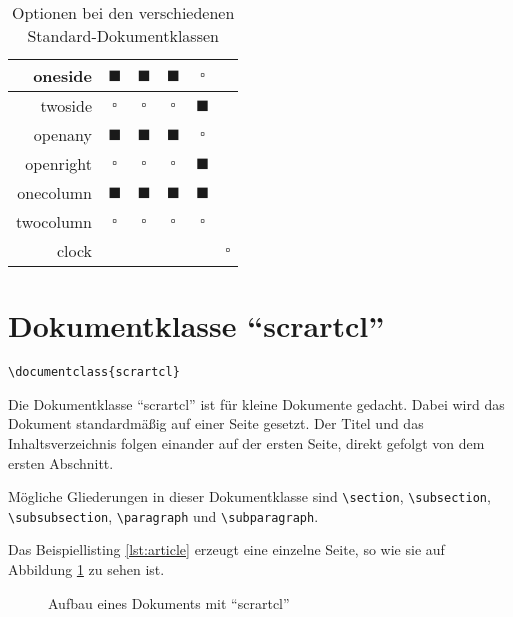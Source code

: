 \begin{table}[htbp]
\begin{center}
\begin{tabular}{r|c|c|c|c|c}
			oneside &
			$\blacksquare$ &
			$\blacksquare$ &
			$\blacksquare$ &
			$\square$ &
			\\ \hline
			twoside &
			$\square$ &
			$\square$ &
			$\square$ &
			$\blacksquare$ &
			\\ \hline
			openany &
			$\blacksquare$ &
			$\blacksquare$ &
			$\blacksquare$ &
			$\square$ &
			\\ \hline
			openright &
			$\square$ &
			$\square$ &
			$\square$ &
			$\blacksquare$ &
			\\ \hline
			onecolumn &
			$\blacksquare$ &
			$\blacksquare$ &
			$\blacksquare$ &
			$\blacksquare$ &
			\\ \hline
			twocolumn &
			$\square$ &
			$\square$ &
			$\square$ &
			$\square$ &
			\\ \hline
			clock & & & & & $\square$ \\
		\end{tabular}
	\end{center}

	\caption{Optionen bei den verschiedenen Standard-Dokumentklassen}
	\label{tab:classoptions}
\end{table}

\section{Dokumentklasse \enquote{scrartcl}}

\begin{lstlisting}
\documentclass{scrartcl}
\end{lstlisting}

Die Dokumentklasse \enquote{scrartcl} ist für kleine Dokumente gedacht. Dabei wird das Dokument standardmäßig auf einer Seite gesetzt. Der Titel und das Inhaltsverzeichnis folgen einander auf der ersten Seite, direkt gefolgt von dem ersten Abschnitt.

Mögliche Gliederungen in dieser Dokumentklasse sind \texttt{\textbackslash section}, \texttt{\textbackslash subsection},
\\
\texttt{\textbackslash subsubsection}, \texttt{\textbackslash paragraph} und \texttt{\textbackslash subparagraph}.

Das Beispiellisting \ref{lst:article} erzeugt eine einzelne Seite, so wie sie auf Abbildung \ref{fig:article} zu sehen ist.

\begin{figure}[htb]
	\begin{center}
	\end{center}
	\caption{Aufbau eines Dokuments mit \enquote{scrartcl}}
	\label{fig:article}
\end{figure}

